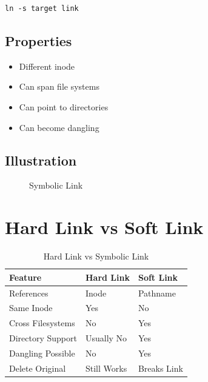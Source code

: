\begin{verbatim}
ln -s target link
\end{verbatim}

\subsection{Properties}

\begin{itemize}
\item Different inode
\item Can span file systems
\item Can point to directories
\item Can become dangling
\end{itemize}

\subsection{Illustration}

\begin{figure}[h]
\centering
{}
\caption{Symbolic Link}
\end{figure}

\section{Hard Link vs Soft Link}

\begin{table}[h]
\centering
\small
\begin{tabular}{|p{4cm}|p{5cm}|p{5cm}|}
\hline
Feature & Hard Link & Soft Link \\
\hline
References & Inode & Pathname \\
\hline
Same Inode & Yes & No \\
\hline
Cross Filesystems & No & Yes \\
\hline
Directory Support & Usually No & Yes \\
\hline
Dangling Possible & No & Yes \\
\hline
Delete Original & Still Works & Breaks Link \\
\hline
\end{tabular}
\caption{Hard Link vs Symbolic Link}
\end{table}

